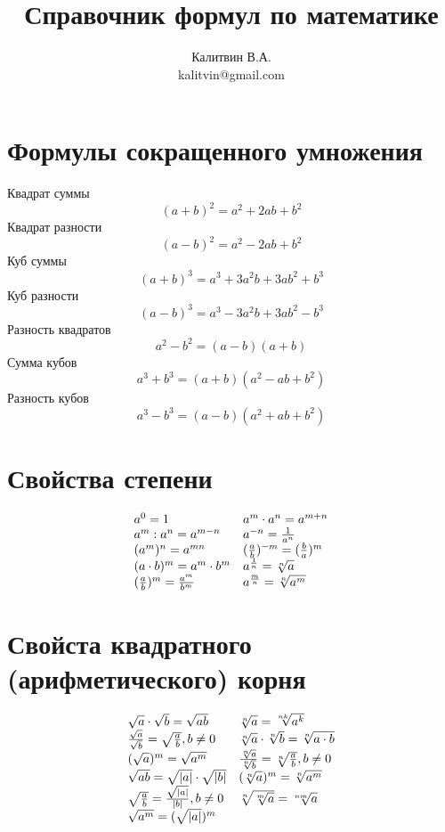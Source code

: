 \documentclass[a4paper, 12pt]{article}
\begin{document}
\author{Калитвин В.А.\\
kalitvin@gmail.com}
\title{Справочник формул по математике}
\maketitle
\thispagestyle{empty}
\newpage
\section{Формулы сокращенного умножения}

\noindent Квадрат суммы
$$ (a+b)^2=a^2+2ab+b^2$$
Квадрат разности
$$(a-b)^2=a^2-2ab+b^2$$
Куб суммы
$$(a+b)^3=a^3+3a^2b+3ab^2+b^3$$
Куб разности
$$(a-b)^3=a^3-3a^2b+3ab^2-b^3$$
Разность квадратов
$$a^2-b^2=(a-b)(a+b)$$
Сумма кубов
$$a^3+b^3=(a+b)(a^2-ab+b^2)$$
Разность кубов
$$a^3-b^3=(a-b)(a^2+ab+b^2)$$

\section{Свойства степени}

$$
\begin{array}{ll}
a^0=1  & a^m\cdot a^n=a^{m+n}\\
a^m: a^n=a^{m-n} & a^{-n}=\frac{1}{a^n}\\
(a^m)^n=a^{mn} & (\frac{a}{b})^{-m}=(\frac{b}{a})^{m}\\
(a\cdot b)^m=a^m\cdot b^m & a^{\frac{1}{n}}=\root{n}\of{a}\\
(\frac{a}{b})^m =\frac{a^m}{b^m} & a^{\frac{m}{n}}=\root{n}\of{a^m}\\
\end{array}
$$

\section{Свойста квадратного (арифметического) корня}

$$
\begin{array}{ll}
\sqrt{a}\cdot \sqrt{b} = \sqrt{ab}  & \root{n}\of{a}=\root{nk}\of{a^k} \\
\frac{\sqrt{a}}{\sqrt{b}}=\sqrt{\frac{a}{b}}, b\not= 0 & \root{n}\of{a}\cdot \root{n}\of{b}=\root{n}\of{a\cdot b}\\
(\sqrt{a})^m=\sqrt{a^m} & \frac{\root{n}\of{a}}{\root{n}\of{b}}=\root{n}\of{\frac{a}{b}}, b\not=0\\
\sqrt{ab}=\sqrt{|a|}\cdot \sqrt{|b|} & (\root{n}\of{a})^m = \root{n}\of{a^m}\\
\sqrt{\frac{a}{b}}=\frac{\sqrt{|a|}}{|b|}, b\not=0 & \root{n}\of{\root{m}\of{a}} = \root{nm}\of{a}\\
\sqrt{a^m}=(\sqrt{|a|})^m
\end{array}
$$
\end{document}
